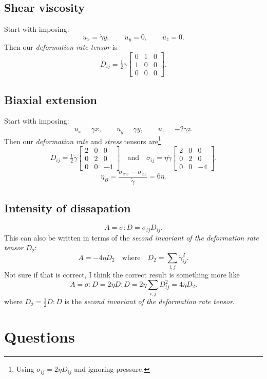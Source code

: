 \subsection{Shear viscosity}
Start with imposing:
\[ u_x = \dot\gamma y, \qquad
	u_y = 0, \qquad
	u_z = 0.
\]
Then our \emph{deformation rate tensor} is
\[
	D_{ij} = \tfrac12\dot\gamma \begin{bmatrix}
		0 & 1 & 0 \\
		1 & 0 & 0 \\
		0 & 0 & 0
	\end{bmatrix}.
\]

\subsection{Biaxial extension}
Start with imposing:
\[
	u_x = \dot\gamma x, \qquad
	u_y = \dot\gamma y, \qquad
	u_z = -2\dot\gamma z.
\]
Then our \emph{deformation rate} and \emph{stress} tensors are\footnote{
	Using $\sigma_{ij} = 2\eta D_{ij}$ and ignoring pressure.
}
\[
	D_{ij} = \tfrac12\dot\gamma \begin{bmatrix}
		2 & 0 & 0 \\
		0 & 2 & 0 \\
		0 & 0 & -4
	\end{bmatrix}
	\quad \text{and} \quad
	\sigma_{ij} = \eta \dot\gamma \begin{bmatrix}
		2 & 0 & 0 \\
		0 & 2 & 0 \\
		0 & 0 & -4
	\end{bmatrix}.
\]
\[
	\boxed{\eta_B = \frac{\sigma_{xx}-\sigma_{zz}}{\dot\gamma} = 6\eta}.
\]
\subsection{Intensity of dissapation}
\[
	A = \sigma : D = \sigma_{ij}D_{ij}.
\]
This can also be written in terms of the \emph{second invariant of the deformation rate tensor} $D_2$:
\[
	A = -4\eta D_2 \quad \text{where}\quad
	D_2 = \sum_{i,j} \dot\gamma_{ij}^2.
\]
Not sure if that is correct, I think the correct result is something more like
\[
	A = \sigma : D = 2\eta D : D = 2\eta \sum_{i,j} D_{ij}^2
	  = 4\eta D_2.
\]
where $D_2= \tfrac12 D:D$ is the \emph{second invariant of the deformation rate tensor}.

\section{Questions}

